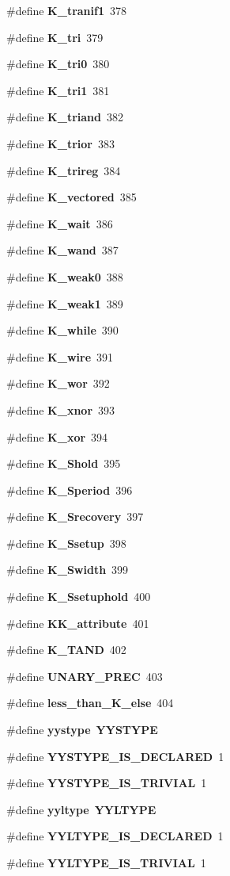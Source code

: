 \begin{CompactItemize}
\#define {\bf K\_\-tranif1}\ 378
\item 
\#define {\bf K\_\-tri}\ 379
\item 
\#define {\bf K\_\-tri0}\ 380
\item 
\#define {\bf K\_\-tri1}\ 381
\item 
\#define {\bf K\_\-triand}\ 382
\item 
\#define {\bf K\_\-trior}\ 383
\item 
\#define {\bf K\_\-trireg}\ 384
\item 
\#define {\bf K\_\-vectored}\ 385
\item 
\#define {\bf K\_\-wait}\ 386
\item 
\#define {\bf K\_\-wand}\ 387
\item 
\#define {\bf K\_\-weak0}\ 388
\item 
\#define {\bf K\_\-weak1}\ 389
\item 
\#define {\bf K\_\-while}\ 390
\item 
\#define {\bf K\_\-wire}\ 391
\item 
\#define {\bf K\_\-wor}\ 392
\item 
\#define {\bf K\_\-xnor}\ 393
\item 
\#define {\bf K\_\-xor}\ 394
\item 
\#define {\bf K\_\-Shold}\ 395
\item 
\#define {\bf K\_\-Speriod}\ 396
\item 
\#define {\bf K\_\-Srecovery}\ 397
\item 
\#define {\bf K\_\-Ssetup}\ 398
\item 
\#define {\bf K\_\-Swidth}\ 399
\item 
\#define {\bf K\_\-Ssetuphold}\ 400
\item 
\#define {\bf KK\_\-attribute}\ 401
\item 
\#define {\bf K\_\-TAND}\ 402
\item 
\#define {\bf UNARY\_\-PREC}\ 403
\item 
\#define {\bf less\_\-than\_\-K\_\-else}\ 404
\item 
\#define {\bf yystype}\ {\bf YYSTYPE}
\item 
\#define {\bf YYSTYPE\_\-IS\_\-DECLARED}\ 1
\item 
\#define {\bf YYSTYPE\_\-IS\_\-TRIVIAL}\ 1
\item 
\#define {\bf yyltype}\ {\bf YYLTYPE}
\item 
\#define {\bf YYLTYPE\_\-IS\_\-DECLARED}\ 1
\item 
\#define {\bf YYLTYPE\_\-IS\_\-TRIVIAL}\ 1
\end{CompactItemize}
